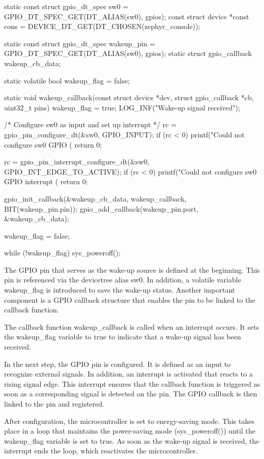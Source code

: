 \begin{cpp}[caption={Power the system off and waking it up}]
static const struct gpio_dt_spec sw0 = GPIO_DT_SPEC_GET(DT_ALIAS(sw0), gpios);
const struct device *const cons = DEVICE_DT_GET(DT_CHOSEN(zephyr_console));

static const struct gpio_dt_spec wakeup_pin = GPIO_DT_SPEC_GET(DT_ALIAS(sw0), gpios);
static struct gpio_callback wakeup_cb_data;

static volatile bool wakeup_flag = false;


static void wakeup_callback(const struct device *dev, struct gpio_callback *cb, uint32_t pins)
{
    wakeup_flag = true;
    LOG_INF("Wake-up signal received");
}

/* Configure sw0 as input and set up interrupt */
rc = gpio_pin_configure_dt(&sw0, GPIO_INPUT);
if (rc < 0)
{
    printf("Could not configure sw0 GPIO (%
    return 0;
}

rc = gpio_pin_interrupt_configure_dt(&sw0, GPIO_INT_EDGE_TO_ACTIVE);
if (rc < 0)
{
    printf("Could not configure sw0 GPIO interrupt (%
    return 0;
}

gpio_init_callback(&wakeup_cb_data, wakeup_callback, BIT(wakeup_pin.pin));
gpio_add_callback(wakeup_pin.port, &wakeup_cb_data);

wakeup_flag = false;

while (!wakeup_flag)
{
    sys_poweroff();
}
            
\end{cpp}

The GPIO pin that serves as the wake-up source is defined at the beginning. This pin is referenced via the devicetree alias sw0. In addition, a volatile variable wakeup\_flag is introduced to save the wake-up status. Another important component is a GPIO callback structure that enables the pin to be linked to the callback function.

The callback function wakeup\_callback is called when an interrupt occurs. It sets the wakeup\_flag variable to true to indicate that a wake-up signal has been received.

In the next step, the GPIO pin is configured. It is defined as an input to recognize external signals. In addition, an interrupt is activated that reacts to a rising signal edge. This interrupt ensures that the callback function is triggered as soon as a corresponding signal is detected on the pin. The GPIO callback is then linked to the pin and registered.

After configuration, the microcontroller is set to energy-saving mode. This takes place in a loop that maintains the power-saving mode (sys\_poweroff()) until the wakeup\_flag variable is set to true. As soon as the wake-up signal is received, the interrupt ends the loop, which reactivates the microcontroller.